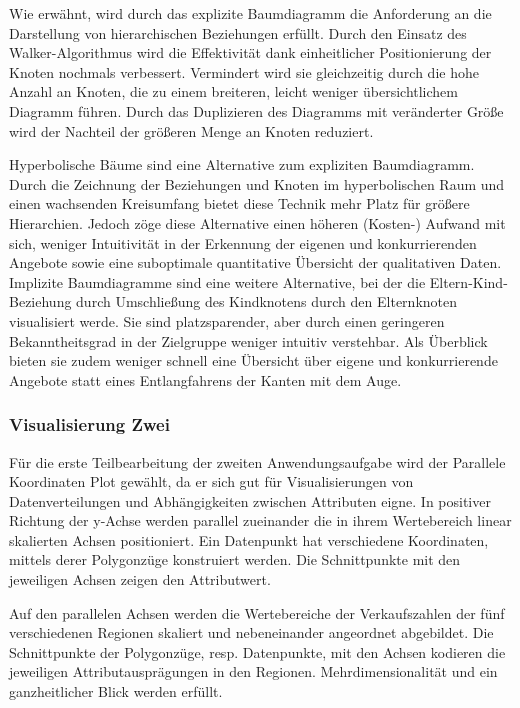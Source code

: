 \documentclass[usegeometry=true]{scrartcl}
\begin{document}
Wie erwähnt, wird durch das explizite Baumdiagramm die Anforderung an die Darstellung von hierarchischen Beziehungen erfüllt.
Durch den Einsatz des Walker-Algorithmus wird die Effektivität dank einheitlicher Positionierung der Knoten nochmals verbessert.\cite[688ff.]{Walker.1990}
Vermindert wird sie gleichzeitig durch die hohe Anzahl an Knoten, die zu einem breiteren, leicht weniger übersichtlichem Diagramm führen. 
Durch das Duplizieren des Diagramms mit veränderter Größe wird der Nachteil der größeren Menge an Knoten reduziert.

Hyperbolische Bäume sind eine Alternative zum expliziten Baumdiagramm. 
Durch die Zeichnung der Beziehungen und Knoten im hyperbolischen Raum und einen wachsenden Kreisumfang bietet diese Technik mehr Platz für größere Hierarchien.\cite[2f.]{Lamping.1995}
Jedoch zöge diese Alternative einen höheren (Kosten-) Aufwand mit sich, weniger Intuitivität in der Erkennung der eigenen und konkurrierenden Angebote sowie eine suboptimale quantitative Übersicht der qualitativen Daten. 
Implizite Baumdiagramme sind eine weitere Alternative, bei der die Eltern-Kind-Beziehung durch Umschließung des Kindknotens durch den Elternknoten visualisiert werde.\cite[394]{Schulz.2011}
Sie sind platzsparender, aber durch einen geringeren Bekanntheitsgrad in der Zielgruppe weniger intuitiv verstehbar. 
Als Überblick bieten sie zudem weniger schnell eine Übersicht über eigene und konkurrierende Angebote statt eines Entlangfahrens der Kanten mit dem Auge.

\subsubsection{Visualisierung Zwei}
Für die erste Teilbearbeitung der zweiten Anwendungsaufgabe wird der Parallele Koordinaten Plot gewählt, da er sich gut für Visualisierungen von Datenverteilungen und Abhängigkeiten zwischen Attributen eigne.\cite[11]{Chan.2006}
In positiver Richtung der y-Achse werden parallel zueinander die in ihrem Wertebereich linear skalierten Achsen positioniert.
Ein Datenpunkt hat verschiedene Koordinaten, mittels derer Polygonzüge konstruiert werden.
Die Schnittpunkte mit den jeweiligen Achsen zeigen den Attributwert.\cite[25f.]{Inselberg.1987}~\cite[11]{Chan.2006}

Auf den parallelen Achsen werden die Wertebereiche der Verkaufszahlen der fünf verschiedenen Regionen skaliert und nebeneinander angeordnet abgebildet.
Die Schnittpunkte der Polygonzüge, resp. Datenpunkte, mit den Achsen kodieren die jeweiligen Attributausprägungen in den Regionen.
Mehrdimensionalität und ein ganzheitlicher Blick werden erfüllt.
\end{document}
